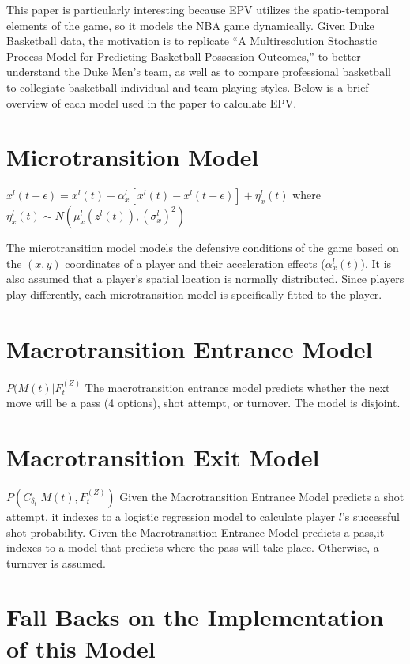 \documentclass[12pt,twoside]{dukestatscithesis}
\theoremstyle{definition}
\theoremstyle{definition}
\theoremstyle{definition}
\theoremstyle{remark}
\begin{document}
This paper is particularly interesting because EPV utilizes the
spatio-temporal elements of the game, so it models the NBA game
dynamically. Given Duke Basketball data, the motivation is to replicate
``A Multiresolution Stochastic Process Model for Predicting Basketball
Possession Outcomes,'' to better understand the Duke Men's team, as well
as to compare professional basketball to collegiate basketball
individual and team playing styles. Below is a brief overview of each
model used in the paper to calculate EPV.

\section{Microtransition Model}\label{microtransition-model}

\(x^{l}(t+\epsilon) = x^{l}(t) + \alpha^{l}_{x}[x^{l}(t) - x^{l}(t-\epsilon)] + \eta^{l}_{x}(t)\)
where
\(\eta^{l}_{x}(t) \sim N(\mu^{l}_{x}(z^{l}(t)), (\sigma^{l}_{x})^{2})\)

The microtransition model models the defensive conditions of the game
based on the \((x,y)\) coordinates of a player and their acceleration
effects (\(\alpha^{l}_{x}(t)\)). It is also assumed that a player's
spatial location is normally distributed. Since players play
differently, each microtransition model is specifically fitted to the
player.

\section{Macrotransition Entrance
Model}\label{macrotransition-entrance-model}

\(P(M(t)|F_{t}^{(Z)}\) The macrotransition entrance model predicts
whether the next move will be a pass (4 options), shot attempt, or
turnover. The model is disjoint.

\section{Macrotransition Exit Model}\label{macrotransition-exit-model}

\(P(C_{\delta_{t}}|M(t), F_{t}^{(Z)})\) Given the Macrotransition
Entrance Model predicts a shot attempt, it indexes to a logistic
regression model to calculate player \(l\)'s successful shot
probability. Given the Macrotransition Entrance Model predicts a pass,it
indexes to a model that predicts where the pass will take place.
Otherwise, a turnover is assumed.

\section{Fall Backs on the Implementation of this
Model}\label{fall-backs-on-the-implementation-of-this-model}
\end{document}
